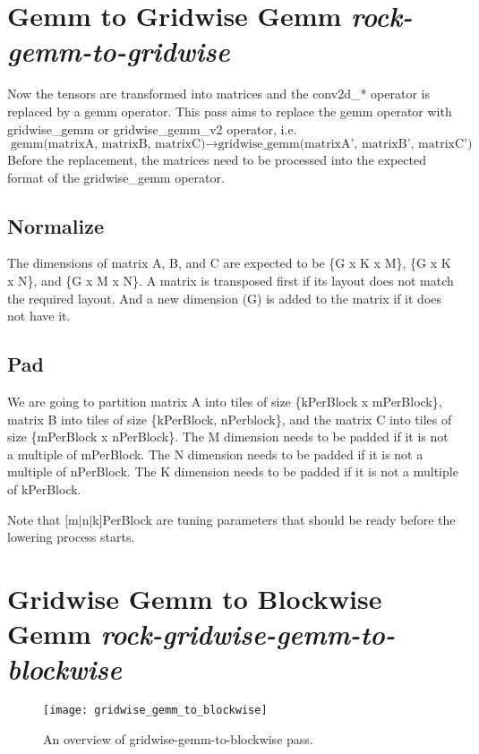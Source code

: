 \section{Gemm to Gridwise Gemm \emph{rock-gemm-to-gridwise}}
Now the tensors are transformed into matrices and the conv2d\_* operator is
replaced by a gemm operator.
This pass aims to replace the gemm operator with gridwise\_gemm or gridwise\_gemm\_v2
operator, i.e.
\begin{equation}
\text{gemm(matrixA, matrixB, matrixC)} \rightarrow \text{gridwise\_gemm(matrixA', matrixB', matrixC')}
\end{equation}
Before the replacement, the matrices need to be processed into the expected format
of the gridwise\_gemm operator.
\subsection{Normalize}
The dimensions of matrix A, B, and C are expected to be \{G x K x M\}, \{G x K x N\},
and \{G x M x N\}.
A matrix is transposed first if its layout does not match the required layout.
And a new dimension (G) is added to the matrix if it does not have it.

\subsection{Pad}
We are going to partition matrix A into tiles of size \{kPerBlock x mPerBlock\},
matrix B into tiles of size  \{kPerBlock, nPerblock\}, and
the matrix C into tiles of size \{mPerBlock x nPerBlock\}.
The M dimension needs to be padded if it is not a multiple of mPerBlock.
The N dimension needs to be padded if it is not a multiple of nPerBlock.
The K dimension needs to be padded if it is not a multiple of kPerBlock.

Note that [m$|$n$|$k]PerBlock are tuning parameters that should be ready
before the lowering process starts.

\section{Gridwise Gemm to Blockwise Gemm \emph{rock-gridwise-gemm-to-blockwise}}


\begin{figure}[!h]
  \centering
  \texttt{[image: gridwise\_gemm\_to\_blockwise]}
  \caption{An overview of gridwise-gemm-to-blockwise pass.}
  \label{fig:gridwise_gemm_to_blockwise}
\end{figure}


